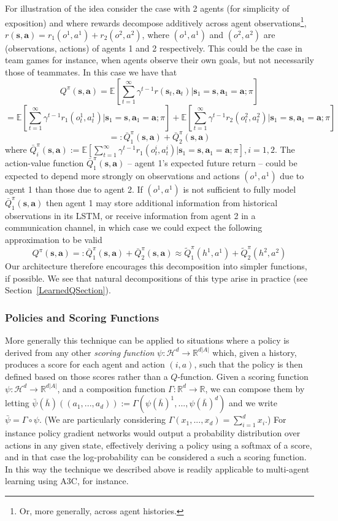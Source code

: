 \documentclass{article}
\def\E{{\mathbb E}} \def\R{{\cal R}}
\def\R{{\cal R}}
\def\bs{{\mathbf{s}}}
\def\ba{{\mathbf{a}}}
\begin{document}
\begin{SCfigure}
For illustration of the idea consider the case with 2 agents (for simplicity of exposition) and where rewards decompose additively across agent observations\footnote{Or, more generally, across agent histories.}, $r(\bs,\ba)=r_1(o^1,a^1)+r_2(o^2,a^2)$, where $(o^1, a^1)$ and $(o^2, a^2)$ are (observations, actions) of agents 1 and 2 respectively. This could be the case in team games for instance, when agents observe their own goals, but not necessarily those of teammates. In this case we have that
$$
Q^\pi(\bs,\ba) = \E [ \sum_{t=1}^\infty \gamma^{t-1} r(\bs_t,\ba_t) | \bs_1 = \bs, \ba_1 = \ba; \pi   ] \nonumber $$ $$
=\E [ \sum_{t=1}^\infty \gamma^{t-1} r_1(o^1_t,a^1_t) | \bs_1 = \bs, \ba_1 = \ba; \pi   ] + \E [ \sum_{t=1}^\infty \gamma^{t-1} r_2(o^2_t,a^2_t) | \bs_1 = \bs, \ba_1 = \ba; \pi   ] \nonumber $$ $$
 =: \bar{Q}^\pi_1(\bs,\ba) + \bar{Q}^\pi_2(\bs,\ba) \nonumber
$$
where $\bar{Q}^\pi_i(\bs,\ba):= \E [ \sum_{t=1}^\infty \gamma^{t-1} r_1(o^i_t,a^i_t) | \bs_1 = \bs, \ba_1 = \ba; \pi   ], i=1,2$. 
The action-value function $\bar{Q}^\pi_1(\bs,\ba)$ -- agent 1's expected future return -- could be expected to depend more strongly on observations and actions $(o^1, a^1)$ due to agent 1 than those due to agent 2. If $(o^1, a^1)$ is not sufficient to fully model $\bar{Q}^\pi_1(\bs,\ba)$ then agent 1 may store additional information from historical observations in its LSTM, or receive information from agent 2 in a communication channel, in which case we could expect the following approximation to be valid
$$
Q^\pi(\bs,\ba) =: \bar{Q}^\pi_1(\bs,\ba) + \bar{Q}^\pi_2(\bs,\ba)  \approx \tilde Q^\pi_1(h^1,a^1) + \tilde Q^\pi_2(h^2,a^2) 
$$
Our architecture therefore encourages this decomposition into simpler functions, if possible. We see that natural decompositions of this type arise in practice (see Section~\ref{LearnedQSection}).



\iffalse
\subsubsection{Policies and Scoring Functions}


More generally this technique can be applied to situations where a policy is derived from any other \emph{scoring function} $\psi:\mathcal{H}^d\to\mathbb{R}^{d|A|}$ which, given a history, produces a score for each agent and action $(i,a)$, such that the policy is then defined based on those scores rather than a $Q$-function. Given a scoring function $\psi:\mathcal{H}^d\to\mathbb{R}^{d|A|}$, and a composition function $\Gamma:\mathbb{R}^d\to\mathbb{R}$, we can compose them by letting $\bar{\psi}(\bar{h})((a_1,...,a_d)) := \Gamma(\psi(\bar{h})^1,...,\psi(\bar{h})^d)$ and we write $\bar{\psi} = \Gamma\circ\psi$. (We are particularly considering $\Gamma(x_1,...,x_d)=\sum_{i=1}^d x_i$.) For instance policy gradient networks would output a probability distribution over actions in any given state, effectively deriving a policy using a softmax of a score, and in that case the log-probability can be considered a such a scoring function. In this way the technique we described above is readily applicable to multi-agent learning using A3C, for instance.



\end{SCfigure}
\end{document}

